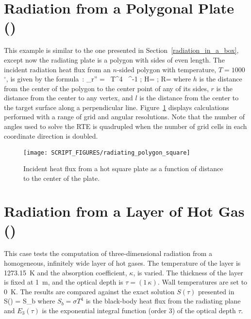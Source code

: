 \documentclass[11pt]{book}
\begin{document}
\section{Radiation from a Polygonal Plate (\texorpdfstring{}{radiating\_polygon}) }
\label{radiating_polygon}

This example is similar to the one presented in Section~\ref{radiation_in_a_box}, except now the radiating plate is a polygon with sides of even length. The incident radiation heat flux from an $n$-sided polygon with temperature, $T=1000$~$^\circ$, is given by the formula~\cite{Siegel:1}:
\be
   \dq_{\rm r}'' = \sigma \, T^4 \,  \; \tan^{-1}  \quad ; \quad H= \quad ; \quad R=
\ee
where $h$ is the distance from the center of the polygon to the center point of any of its sides, $r$ is the distance from the center to any vertex, and $l$ is the distance from the center to the target surface along a perpendicular line. Figure~\ref{radiating_polygon_figure} displays calculations performed with a range of grid and angular resolutions. Note that the number of angles used to solve the RTE is quadrupled when the number of grid cells in each coordinate direction is doubled.

\begin{figure}[ht]
\centering
\texttt{[image: SCRIPT\_FIGURES/radiating\_polygon\_square]}
\caption[The {\ct radiating\_polygon} test case]{Incident heat flux from a hot square plate as a function of distance to the center of the plate.}
\label{radiating_polygon_figure}
\end{figure}



\section{Radiation from a Layer of Hot Gas (\texorpdfstring{}{radiation\_plane\_layer})}
\label{radiation_plane_layer}

This case tests the computation of three-dimensional radiation from a homogeneous, infinitely wide layer of hot gases.  The temperature of
the layer is 1273.15~K and the absorption coefficient, $\kappa$, is varied. The thickness of the layer is fixed at 1~m, and the optical depth is $\tau = (1 \, \kappa)$.
Wall temperatures are set to 0~K. The results are compared against the exact solution $S(\tau)$ presented in~\cite{Zeldovich:1}
\be S(\tau) = S_b \ee
where $S_b = \sigma T^4$ is the black-body heat flux from the radiating plane and $E_3(\tau)$ is the exponential
integral function (order 3) of the optical depth $\tau$.
\end{document}
